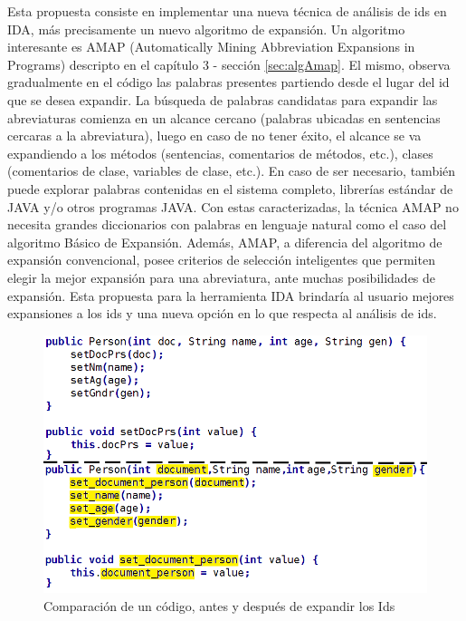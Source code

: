 Esta propuesta consiste en implementar una nueva técnica de análisis de ids en IDA, más precisamente un nuevo algoritmo de expansión. Un algoritmo interesante es AMAP (Automatically Mining Abbreviation Expansions in Programs) descripto en el capítulo 3 - sección \ref{sec:algAmap}. El mismo, observa gradualmente en el código las palabras presentes partiendo desde el lugar del id que se desea expandir.
La búsqueda de palabras candidatas para expandir las abreviaturas comienza en un alcance cercano (palabras ubicadas en sentencias cercaras a la abreviatura), luego en caso de no tener éxito, el alcance se va expandiendo a los métodos (sentencias, comentarios de métodos, etc.), clases (comentarios de clase, variables de clase, etc.). En caso de ser necesario, también puede explorar palabras contenidas en el sistema completo, librerías estándar de JAVA y/o otros programas JAVA. 
Con estas caracterizadas, la técnica AMAP no necesita grandes diccionarios con palabras en lenguaje natural como el caso del algoritmo Básico de Expansión.
Además, AMAP, a diferencia del algoritmo de expansión convencional, posee criterios de selección inteligentes que permiten elegir la mejor expansión para una abreviatura, ante muchas posibilidades de expansión.
Esta propuesta para la herramienta IDA brindaría al usuario mejores expansiones a los ids y una nueva opción en lo que respecta al análisis de ids.

\begin{figure}[t] %
\centerline{%
\includegraphics[scale= 0.52]{./cap6/cod.png}
}
\caption{Comparación de un código, antes y después de expandir los Ids}
\label{cod}
\end{figure}

